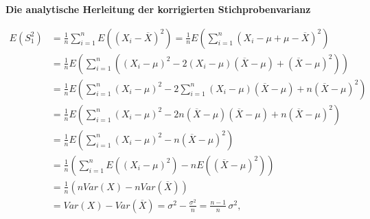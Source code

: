 \textbf{Die analytische Herleitung der korrigierten Stichprobenvarianz}

\begin{align} 
    E (S_1^2)  &= \frac 1n \sum_{i=1}^n E\left( (X_i-\overline{X})^2 \right)= 
  \frac 1n E \left(\sum_{i=1}^n (X_i-\mu+\mu-\overline{X})^2\right)\\
  &=\frac1n E \left(\sum_{i=1}^n \left((X_i-\mu)^2 - 2(X_i-\mu)
  (\overline{X}-\mu) + (\overline{X}-\mu)^2\right) \right)\\
  &=\frac1n E\left(\sum_{i=1}^n (X_i-\mu)^2 - 2\sum_{i=1}^n(X_i-\mu)
  (\overline{X}-\mu) + n(\overline{X}-\mu)^2\right) \\
  &=\frac1n E\left(\sum_{i=1}^n (X_i-\mu)^2 - 2n(\overline{X}-\mu)
  (\overline{X}-\mu) + n(\overline{X}-\mu)^2\right) \\
  &=\frac1n E\left(\sum_{i=1}^n (X_i-\mu)^2 -n(\overline{X}-\mu)^2\right) \\
  &=\frac1n \left(\sum_{i=1}^n E\left((X_i-\mu)^2\right) -nE\left((\overline{X}-\mu)^2\right)\right) \\
  &=\frac1n \left(nVar(X)-nVar(\overline{X})\right) \\
  &=Var(X)-Var(\overline{X}) = \sigma^2 - \frac{\sigma^2}{n} = \frac{n-1}{n}\,\sigma^2, \end{align} 


 




